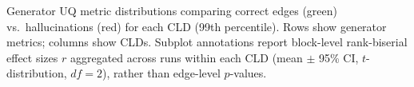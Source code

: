 \caption[UQ metric distributions by CLD]{Generator UQ metric distributions comparing correct edges (green) vs.\ hallucinations (red) for each CLD (99th percentile). Rows show generator metrics; columns show CLDs. Subplot annotations report block-level rank-biserial effect sizes $r$ aggregated across runs within each CLD (mean $\pm$ 95\% CI, $t$-distribution, $df=2$), rather than edge-level $p$-values.}
\label{fig:rq2_distributions_by_cld}